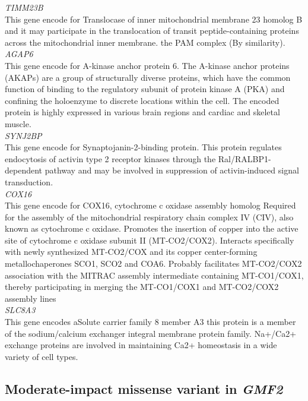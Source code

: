 \textit{TIMM23B}\\
This gene encode for Translocase of inner mitochondrial membrane 23 homolog B and it may participate in the translocation of transit peptide-containing proteins across the mitochondrial inner membrane. the PAM complex (By similarity).\\

\textit{AGAP6}\\
This gene encode for A-kinase anchor protein 6.
The A-kinase anchor proteins (AKAPs) are a group of structurally diverse proteins, which have the common function of binding to the regulatory subunit of protein kinase A (PKA) and confining the holoenzyme to discrete locations within the cell.
The encoded protein is highly expressed in various brain regions and cardiac and skeletal muscle. \\

\textit{SYNJ2BP}\\
This gene encode for Synaptojanin-2-binding protein.
This protein regulates endocytosis of activin type 2 receptor kinases through the Ral/RALBP1-dependent pathway and may be involved in suppression of activin-induced signal transduction. \\


\textit{COX16}\\
This gene encode for COX16, cytochrome c oxidase assembly homolog
Required for the assembly of the mitochondrial respiratory chain complex IV (CIV), also known as cytochrome c oxidase. Promotes the insertion of copper into the active site of cytochrome c oxidase subunit II (MT-CO2/COX2). Interacts specifically with newly synthesized MT-CO2/COX and its copper center-forming metallochaperones SCO1, SCO2 and COA6. Probably facilitates MT-CO2/COX2 association with the MITRAC assembly intermediate containing MT-CO1/COX1, thereby participating in merging the MT-CO1/COX1 and MT-CO2/COX2 assembly lines \\

\textit{SLC8A3}\\
This gene encodes aSolute carrier family 8 member A3
this protein is a member of the sodium/calcium exchanger integral membrane protein family. Na+/Ca2+ exchange proteins are involved in maintaining Ca2+ homeostasis in a wide variety of cell types.\\

\subsection{ Moderate-impact missense variant in \textit{GMF2} }

